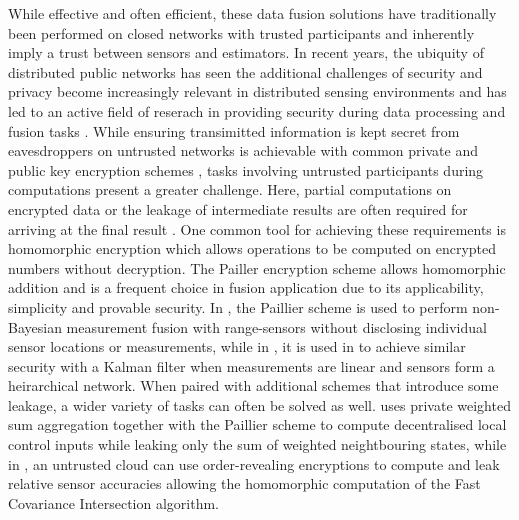 \documentclass[letterpaper, 10 pt, conference]{ieeeconf}
\begin{document}
While effective and often efficient, these data fusion solutions have traditionally been performed on closed networks with trusted participants and inherently imply a trust between sensors and estimators. In recent years, the ubiquity of distributed public networks has seen the additional challenges of security and privacy become increasingly relevant in distributed sensing environments and has led to an active field of reserach in providing security during data processing and fusion tasks \cite{renSecurityChallengesPublic2012,brennerSecretProgramExecution2011}. While ensuring transimitted information is kept secret from eavesdroppers on untrusted networks is achievable with common private and public key encryption schemes \cite{katzIntroductionModernCryptography2008}, tasks involving untrusted participants during computations present a greater challenge. Here, partial computations on encrypted data or the leakage of intermediate results are often required for arriving at the final result \cite{risticSecureFastCovariance2021,shiPrivacyPreservingAggregationTimeSeries2011}. One common tool for achieving these requirements is homomorphic encryption \cite{gentryFullyHomomorphicEncryption2009,paillierPublicKeyCryptosystemsBased1999} which allows operations to be computed on encrypted numbers without decryption. The Pailler encryption scheme \cite{paillierPublicKeyCryptosystemsBased1999} allows homomorphic addition and is a frequent choice in fusion application due to its applicability, simplicity and provable security. In \cite{alanwarPrOLocResilientLocalization2017}, the Paillier scheme is used to perform non-Bayesian measurement fusion with range-sensors without disclosing individual sensor locations or measurements, while in \cite{aristovEncryptedMultisensorInformation2018}, it is used in to achieve similar security with a Kalman filter when measurements are linear and sensors form a heirarchical network. When paired with additional schemes that introduce some leakage, a wider variety of tasks can often be solved as well. \cite{alexandruEncryptedCooperativeControl2019} uses private weighted sum aggregation together with the Paillier scheme to compute decentralised local control inputs while leaking only the sum of weighted neightbouring states, while in \cite{risticSecureFastCovariance2021}, an untrusted cloud can use order-revealing encryptions to compute and leak relative sensor accuracies allowing the homomorphic computation of the Fast Covariance Intersection algorithm.
\end{document}
